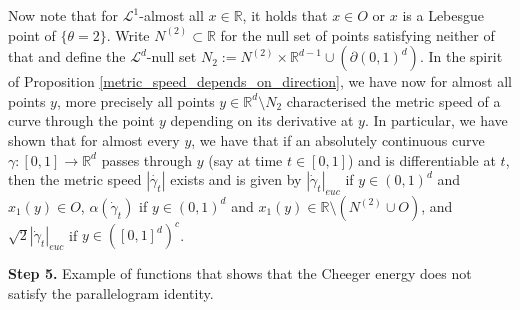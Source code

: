 \documentclass[a4paper,10pt]{article}
\numberwithin{equation}{section}
\newcommand{\R}{\mathbb{R}}
\begin{document}
Now note that for $\mathcal{L}^1$-almost all $x \in \R$, it holds that $x \in O$ or $x$ is a Lebesgue point of $\{\theta =2\}$. 
Write $N^{(2)} \subset \R$ for the null set of points satisfying neither of that and define the $\mathcal{L}^d$-null set $N_2 := N^{(2)} \times \R^{d-1} \cup (\partial (0,1)^d)$.
In the spirit of Proposition \ref{metric_speed_depends_on_direction}, we have now for almost all points $y$, more precisely all points $y \in \R^d \setminus N_2$ characterised the metric speed of a curve through the point $y$ depending on its derivative at $y$. In particular, we have shown that for almost every $y$, we have that if an absolutely continuous curve $\gamma:[0,1] \to \R^d$ passes through $y$ (say at time $t \in [0,1]$) and is differentiable at $t$, then the metric speed $|\dot{\gamma_t}|$ exists and is given by $|\dot{\gamma}_t|_{euc}$ if $y \in (0,1)^d$ and $x_1(y) \in O$, $\alpha(\dot{\gamma}_t)$ if $y \in (0,1)^d$ and $x_1(y) \in \R \setminus (N^{(2)} \cup O)$, and $\sqrt{2}|\dot{\gamma}_t|_{euc}$ if $y \in ([0,1]^{d})^c$.  

\textbf{Step 5.} Example of functions that shows that the Cheeger energy does not satisfy the parallelogram identity.
\end{document}
